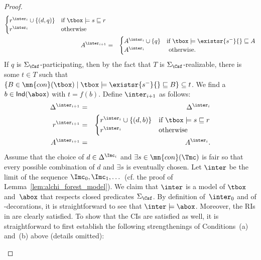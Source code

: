 \documentclass{lmcs}
\theoremstyle{definition}
\begin{document}
\begin{proof}
\begin{eqnarray*}
\begin{cases}
        r^{\inter_{i}}\cup\{(d,q)\} & \text{if }
        \tbox\models s\sqsubseteq r\\
        r^{\inter_{i}} & \text{otherwise}
      \end{cases}\\
      A^{\inter_{i+1}} & = & \begin{cases}
        A^{\inter_i}\cup\{q\} & \text{if }\tbox\models \existsr{s^-}{}\sqsubseteq A\\
        A^{\inter_i} & \text{ otherwise.}
      \end{cases}
    \end{eqnarray*}
    If $q$ is $\Sigma_{\Csf}$-participating, then by the fact that $T$ is
    $\Sigma_{\Csf}$-realizable, there is some $t\in T$ such that
    $\{B\in \mn{con}(\tbox)\mid \tbox\models\existsr{s^-}{}\sqsubseteq
    B\}\subseteq t$. We find a $b\in\mathsf{Ind}(\abox)$ with
    $t=f(b)$. Define $\inter_{i+1}$ as follows:
    \begin{eqnarray*}
      \Delta^{\inter_{i+1}} & = & \Delta^{\inter_i}\\
      r^{\inter_{i+1}} & = & \begin{cases}
        r^{\inter_{i}}\cup\{(d,b)\} & \text{if }\tbox\models s\sqsubseteq r\\
        r^{\inter_{i}} & \text{otherwise}
      \end{cases}
      \\
      A^{\inter_{i+1}} & = & A^{\inter_i}.
    \end{eqnarray*}
    Assume that the choice of $d \in \Delta^{\Imc_i}$ and $\exists s
    \in \mn{con}(\Tmc)$ is fair so that every possible combination of
    $d$ and $\exists s$ is eventually chosen. Let
    $\inter$ be the limit of the sequence $\Imc_0,\Imc_1,\dots$ (cf. the proof of Lemma~\ref{lem:alchi_forest_model}).
    We claim that $\inter$ is a model of $\tbox$ and~$\abox$ that
    respects closed predicates $\Sigma_{\Csf}$. By definition of~$\inter_0$
    and of \Tmc-decorations, it is straightforward to see that
    $\inter\models\abox$. Moreover, the RIs in \Tmc are
    clearly satisfied. To show that the CIs are
    satisfied as well, it is straightforward to first establish the
    following strengthenings of Conditions~(a) and~(b) above (details
    omitted):
    \begin{enumerate}


\end{enumerate}
\end{proof}
\end{document}
